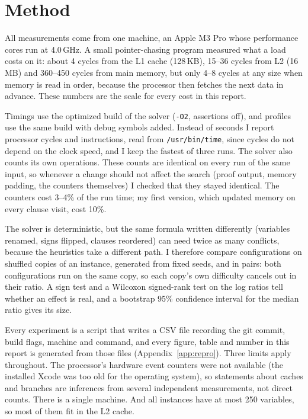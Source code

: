 \section{Method}
\label{sec:method}

All measurements come from one machine, an Apple M3 Pro whose performance
cores run at 4.0\,GHz. A small pointer-chasing program measured what a load
costs on it: about 4 cycles from the L1 cache (128\,KB), 15--36 cycles from L2
(16\,MB) and 360--450 cycles from main memory, but only 4--8 cycles at any size
when memory is read in order, because the processor then fetches the next data
in advance. These numbers are the scale for every cost in this report.

Timings use the optimized build of the solver (\texttt{-O2}, assertions off),
and profiles use the same build with debug symbols added. Instead of seconds
I report processor cycles and instructions, read from \texttt{/usr/bin/time},
since cycles do not depend on the clock speed, and I keep the fastest of three
runs. The solver also counts its own operations. These counts are identical on
every run of the same input, so whenever a change should not affect the search
(proof output, memory padding, the counters themselves) I checked that they
stayed identical. The counters cost 3--4\% of the run time; my first version,
which updated memory on every clause visit, cost 10\%.

The solver is deterministic, but the same formula written differently
(variables renamed, signs flipped, clauses reordered) can need twice as many
conflicts, because the heuristics take a different path. I therefore compare
configurations on shuffled copies of an instance, generated from fixed seeds,
and in pairs: both configurations run on the same copy, so each copy's own
difficulty cancels out in their ratio. A sign test and a Wilcoxon signed-rank
test on the log ratios tell whether an effect is real, and a bootstrap 95\%
confidence interval for the median ratio gives its size.

Every experiment is a script that writes a CSV file recording the git commit,
build flags, machine and command, and every figure, table and number in this
report is generated from those files (Appendix~\ref{app:repro}). Three limits
apply throughout. The processor's hardware event counters were not available
(the installed Xcode was too old for the operating system), so statements
about caches and branches are inferences from several independent
measurements, not direct counts. There is a single machine. And all instances
have at most 250 variables, so most of them fit in the L2 cache.
